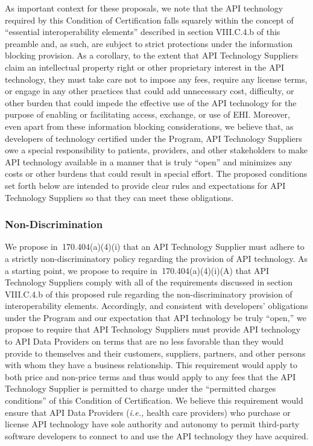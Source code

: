 \documentclass[twoside,11pt]{article}
\begin{document}
          As important context for these proposals, we note that the API technology required by this Condition of Certification falls squarely within the concept of “essential interoperability elements” described in section VIII.C.4.b of this preamble and, as such, are subject to strict protections under the information blocking provision. As a corollary, to the extent that API Technology Suppliers claim an intellectual property right or other proprietary interest in the API technology, they must take care not to impose any fees, require any license terms, or engage in any other practices that could add unnecessary cost, difficulty, or other burden that could impede the effective use of the API technology for the purpose of enabling or facilitating access, exchange, or use of EHI. Moreover, even apart from these information blocking considerations, we believe that, as developers of technology certified under the Program, API Technology Suppliers owe a special responsibility to patients, providers, and other stakeholders to make API technology available in a manner that is truly “open” and minimizes any costs or other burdens that could result in special effort. The proposed conditions set forth below are intended to provide clear rules and expectations for API Technology Suppliers so that they can meet these obligations.


          \subsubsection{Non-Discrimination}


          We propose in \textsection{} 170.404(a)(4)(i) that an API Technology Supplier must adhere to a strictly non-discriminatory policy regarding the provision of API technology. As a starting point, we propose to require in \textsection{} 170.404(a)(4)(i)(A) that API Technology Suppliers comply with all of the requirements discussed in section VIII.C.4.b of this proposed rule regarding the non-discriminatory provision of interoperability elements. Accordingly, and consistent with developers' obligations under the Program and our expectation that API technology be truly “open,” we propose to require that API Technology Suppliers must provide API technology to API Data Providers on terms that are no less favorable than they would provide to themselves and their customers, suppliers, partners, and other persons with whom they have a business relationship. This requirement would apply to both price and non-price terms and thus would apply to any fees that the API Technology Supplier is permitted to charge under the “permitted charges conditions” of this Condition of Certification. We believe this requirement would ensure that API Data Providers (\emph{i.e.,} health care providers) who purchase or license API technology have sole authority and autonomy to permit third-party software developers to connect to and use the API technology they have acquired.
\end{document}
